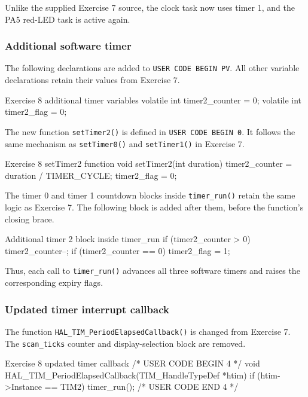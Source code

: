 \documentclass[a4paper]{article}
\begin{document}
Unlike the supplied Exercise 7 source,
the clock task now uses timer 1, and the
PA5 red-LED task is active again.

\subsubsection{Additional software timer}

The following declarations are added to
\texttt{USER CODE BEGIN PV}.
All other variable declarations retain
their values from Exercise 7.

\begin{stmcode}{Exercise 8 additional timer variables}
volatile int timer2_counter = 0;
volatile int timer2_flag = 0;
\end{stmcode}

The new function \texttt{setTimer2()} is
defined in \texttt{USER CODE BEGIN 0}.
It follows the same mechanism as
\texttt{setTimer0()} and \texttt{setTimer1()}
in Exercise 7.

\begin{stmcode}{Exercise 8 setTimer2 function}
void setTimer2(int duration) {
  timer2_counter = duration / TIMER_CYCLE;
  timer2_flag = 0;
}
\end{stmcode}

The timer 0 and timer 1 countdown blocks
inside \texttt{timer\_run()} retain the
same logic as Exercise 7. The following
block is added after them, before the
function's closing brace.

\begin{stmcode}{Additional timer 2 block inside timer_run}
if (timer2_counter > 0) {
  timer2_counter--;
  if (timer2_counter == 0) {
    timer2_flag = 1;
  }
}
\end{stmcode}

Thus, each call to \texttt{timer\_run()}
advances all three software timers and
raises the corresponding expiry flags.

\subsubsection{Updated timer interrupt callback}

The function
\texttt{HAL\_TIM\_PeriodElapsedCallback()}
is changed from Exercise 7.
The \texttt{scan\_ticks} counter and
display-selection block are removed.

\begin{stmcode}{Exercise 8 updated timer callback}
/* USER CODE BEGIN 4 */
void HAL_TIM_PeriodElapsedCallback(TIM_HandleTypeDef *htim)
{
    if (htim->Instance == TIM2)
    {
        timer_run();
    }
}
/* USER CODE END 4 */
\end{stmcode}
\end{document}
